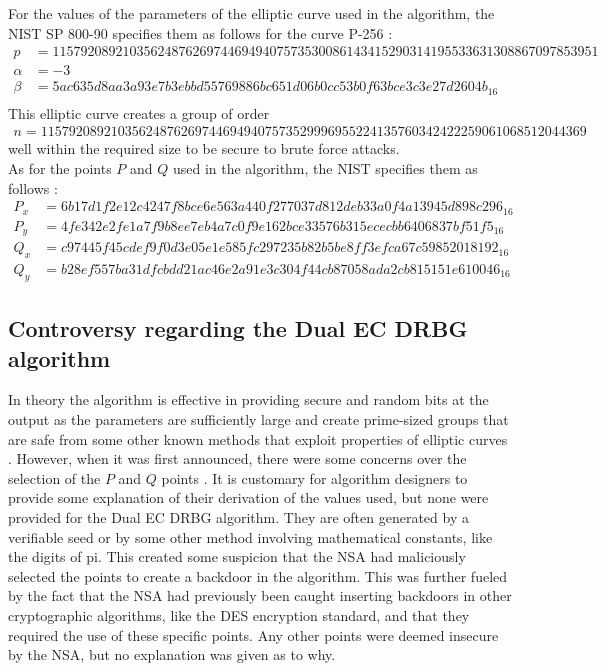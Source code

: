 For the values of the parameters of the elliptic curve used in the algorithm, the NIST SP 800-90 specifies them as follows for the curve P-256 \cite{nist-sp800-90}:
\begin{align*}
    p &= 115792089210356248762697446949407573530086143415290314195533631308867097853951 \\
    \alpha &= -3 \\
    \beta &= 5ac635d8 aa3a93e7 b3ebbd55 769886bc 651d06b0 cc53b0f6 3bce3c3e 27d2604b_{16} \\
\end{align*}
This elliptic curve creates a group of order 
\begin{gather*}
    n = 115792089210356248762697446949407573529996955224135760342422259061068512044369 \label{eq:order}
\end{gather*} 
well within the required size to be secure to brute force attacks.
\\

\noindent
As for the points $P$ and $Q$ used in the algorithm, the NIST specifies them as follows \cite{nist-sp800-90}:
\begin{align*}
    P_x &= 6b17d1f2 e12c4247 f8bce6e5 63a440f2 77037d81 2deb33a0 f4a13945 d898c296_{16}\\
    P_y &= 4fe342e2 fe1a7f9b 8ee7eb4a 7c0f9e16 2bce3357 6b315ece cbb64068 37bf51f5_{16}\\
    Q_x &= c97445f4 5cdef9f0 d3e05e1e 585fc297 235b82b5 be8ff3ef ca67c598 52018192_{16}\\
    Q_y &= b28ef557 ba31dfcb dd21ac46 e2a91e3c 304f44cb 87058ada 2cb81515 1e610046_{16}
\end{align*}

\subsection{Controversy regarding the Dual EC DRBG algorithm}

In theory the algorithm is effective in providing secure and random bits at the output as the parameters are sufficiently large and create prime-sized groups that are safe from some other known methods that exploit properties of elliptic curves \cite{secure-randomness}. However, when it was first announced, there were some concerns over the selection of the $P$ and $Q$ points \cite{green-2013-dualec-flaws}. It is customary for algorithm designers to provide some explanation of their derivation of the values used, but none were provided for the Dual EC DRBG algorithm. They are often generated by a verifiable seed or by some other method involving mathematical constants, like the digits of pi. This created some suspicion that the NSA had maliciously selected the points to create a backdoor in the algorithm. This was further fueled by the fact that the NSA had previously been caught inserting backdoors in other cryptographic algorithms, like the DES encryption standard, and that they required the use of these specific points. Any other points were deemed insecure by the NSA, but no explanation was given as to why.
\\

